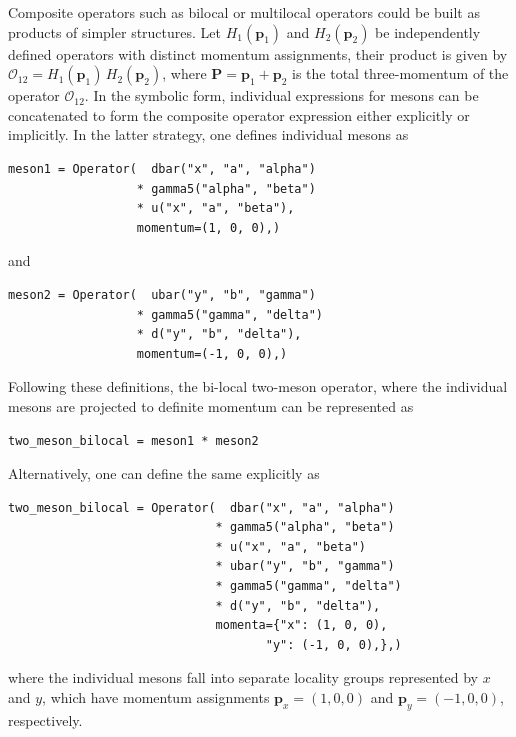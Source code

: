 \documentclass[a4paper,fleqn]{cas-dc}
\begin{document}
Composite operators such as bilocal or multilocal operators could be built as products of simpler structures. Let $H_1(\mathbf p_1)$ and $H_2(\mathbf p_2)$ be independently defined operators with distinct momentum assignments, their product is given by $\mathcal O_{12} = H_1(\mathbf p_1)\,H_2(\mathbf p_2)$, where $\mathbf P=\mathbf p_1+\mathbf p_2$ is the total three-momentum of the operator $\mathcal O_{12}$. In the symbolic form, individual expressions for mesons can be concatenated to form the composite operator expression either explicitly or implicitly. In the latter strategy, one defines individual mesons as  
\begin{verbatim}
meson1 = Operator(  dbar("x", "a", "alpha")
                  * gamma5("alpha", "beta")
                  * u("x", "a", "beta"),
                  momentum=(1, 0, 0),)
\end{verbatim}
and 
\begin{verbatim}
meson2 = Operator(  ubar("y", "b", "gamma")
                  * gamma5("gamma", "delta")
                  * d("y", "b", "delta"),
                  momentum=(-1, 0, 0),)
\end{verbatim}
Following these definitions, the bi-local two-meson operator, where the individual mesons are projected to definite momentum can be represented as 
\begin{verbatim}
two_meson_bilocal = meson1 * meson2
\end{verbatim}
Alternatively, one can define the same explicitly as 
\begin{verbatim}
two_meson_bilocal = Operator(  dbar("x", "a", "alpha")
                             * gamma5("alpha", "beta")
                             * u("x", "a", "beta")
                             * ubar("y", "b", "gamma")
                             * gamma5("gamma", "delta")
                             * d("y", "b", "delta"),
                             momenta={"x": (1, 0, 0),
                                    "y": (-1, 0, 0),},)
\end{verbatim}
where the individual mesons fall into separate locality groups represented by $x$ and $y$, which have momentum assignments $\mathbf p_x=(1, 0, 0)$ and $\mathbf p_y=(-1, 0, 0)$, respectively.
\end{document}
